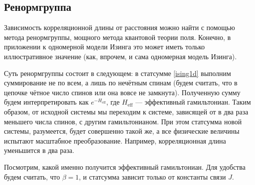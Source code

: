 \documentclass{article}
\begin{document}
		\subsection{Ренормгруппа}
		Зависимость корреляционной длины от расстояния 
		можно найти с помощью метода ренормгруппы,
		мощного метода квантовой теории поля. Конечно, 
		в приложении к одномерной модели Изинга
		это может иметь только иллюстративное значение 
		(как, впрочем, и сама одномерная модель
		Изинга).

		Суть ренормгруппы состоит в следующем: 
		в статсумме \ref{ising1d} выполним суммирование
		не по всем, а лишь по нечётным спинам (будем считать, 
		что в цепочке чётное число спинов
		или она вовсе не замкнута). Полученную сумму будем интерпретировать 
		как $e^{-H_{\mathrm{eff}}}$,
		где $H_{\mathrm{eff}}$ --- эффективный гамильтониан. 
		Таким образом, от исходной системы мы
		переходим к системе, зависящей от в два раза меньшего числа спинов, с другим 
		гамильтонианом. При этом статсумма новой системы, разумеется, 
		будет совершенно такой же,
		а все физические величины испытают масштабное 
		преобразование. Например, корреляционная
		длина уменьшится в два раза.

		Посмотрим, какой именно получится эффективный гамильтониан. 
		Для удобства будем считать,
		что $\beta = 1$, и статсумма зависит только от константы связи $J$.
	
\end{document}
